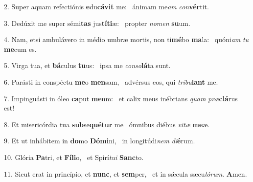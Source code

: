 2. Super aquam refectiónis \textbf{e}du\textbf{cá}\textbf{vit} me: \ast\  ánimam me\textit{am} \textit{con}\textbf{vér}tit.\

3. Dedúxit me super sémi\textbf{tas} jus\textbf{tí}\textbf{ti}æ: \ast\  propter \textit{no}\textit{men} \textbf{su}um.\

4. Nam, etsi ambulávero in médio umbræ mortis, non ti\textbf{mé}bo \textbf{ma}la: \ast\  quóni\textit{am} \textit{tu} \textbf{me}cum es.\

5. Virga tua, et \textbf{bá}culus \textbf{tu}us: \ast\  ipsa me \textit{con}\textit{so}\textbf{lá}ta sunt.\

6. Parásti in conspéctu \textbf{me}o \textbf{men}sam, \ast\  advérsus eos, qui \textit{trí}\textit{bu}\textbf{lant} me.\

7. Impinguásti in óleo \textbf{ca}put \textbf{me}um: \ast\  et calix meus inébrians \textit{quam} \textit{præ}\textbf{clá}rus est!\

8. Et misericórdia tua \textbf{sub}se\textbf{qué}\textbf{tur} me \ast\  ómnibus diébus \textit{vi}\textit{tæ} \textbf{me}æ.\

9. Et ut inhábitem in \textbf{do}mo \textbf{Dó}\textbf{mi}ni, \ast\  in longitúdi\textit{nem} \textit{di}\textbf{é}rum.\

10. Glória \textbf{Pa}tri, et \textbf{Fí}\textbf{li}o, \ast\  et Spirí\textit{tu}\textit{i} \textbf{Sanc}to.\

11. Sicut erat in princípio, et \textbf{nunc}, et \textbf{sem}per, \ast\  et in sǽcula sæcu\textit{ló}\textit{rum}. \textbf{A}men.\

